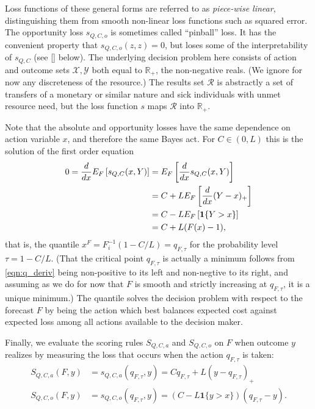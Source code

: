 \documentclass{article}
\begin{document}
Loss functions of these general forms are referred to as \emph{piece-wise linear}, distinguishing them from smooth non-linear loss functions such as squared error. The opportunity loss $s_{Q,C,o}$ is sometimes called ``pinball'' loss. It has the convenien{}t 
{}property that $s_{Q,C,o}(z,z)=0$, but loses some of the interpretability of $s_{Q,C}$ (see \ref{} below).
The underlying decision problem here consists of action and outcome sets $\mathcal{X},\mathcal{Y}$ both equal to $\mathbb{R}_+$, the non-negative reals.  (We ignore for now any discreteness of the resource.) The results set $\mathcal{R}$ is abstractly a set of transfers of a monetary or similar nature and sick individuals with unmet resource need, but the loss function $s$ maps $\mathcal{R}$ into $\mathbb{R}_+$. 

Note that the absolute and opportunity losses have the same dependence on action variable $x$, and therefore the same Bayes act. For $C \in (0,L)$ this is the solution of the first order equation 
\begin{align}{}
0 = \frac{d {} }{d {x}} E_F\left[s_{Q,C}(x,Y)\right] &= E_F\left[\frac{d {} }{d {x}}s_{Q,C}(x,Y)\right] \\
&= C + LE_F\left[\frac{d {} }{d {x}}(Y-x)_+\right] \\
&= C - LE_F\left[\mathbf{1}\{Y > x\}\right] \\
&= C + L(F(x) - 1), \label{eqn:q_deriv}
\end{align}
that is, the quantile $x^F = F_i^{-1}(1 - C/L) = q_{F,\tau}$ for the probability level $\tau = 1-C/L$. (That the critical point $q_{F,\tau}$ is actually a minimum follows from \eqref{eqn:q_deriv} being non-positive to its left and non-negtive to its right, and assuming as we do for now that $F$ is smooth and strictly increasing at $q_{F,\tau}$, it is a unique minimum.) The quantile solves the decision problem with respect to the forecast $F$ by being the action which best balances expected cost against expected loss among all actions available to the decision maker. 

Finally, we evaluate the scoring rules $S_{Q,C,a}$ and $S_{Q,C,o}$ on $F$ when outcome $y$ realizes by measuring the loss that occurs when the action $q_{F,\tau}$ is taken:
\begin{align}
S_{Q,C,a}(F,y) &= s_{Q,C,a}(q_{F,\tau}, y) = Cq_{F,\tau} + L(y- q_{F,\tau})_{+} \\
S_{Q,C,o}(F,y) &= s_{Q,C,o}(q_{F,\tau}, y) = (C - L \mathbf{1}\{y > x\})(q_{F,\tau}-y).
\end{align}
\end{document}
